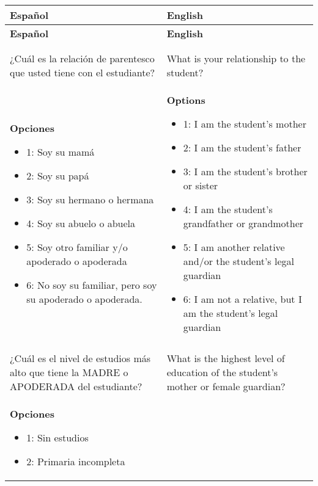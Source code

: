 \documentclass[11pt]{article}
\begin{document}
\newpage
\begin{longtable}{@{}LL@{}}
\toprule
\textbf{Español} & \textbf{English} \\ 
\midrule
\endfirsthead
\toprule
\textbf{Español} & \textbf{English} \\ 
\midrule
\endhead
\bottomrule \\ 
\endfoot
\bottomrule
{} \\ 
¿Cuál es la relación de parentesco que usted tiene con el estudiante? & What is your relationship to the student? \\
\textbf{Opciones}\par\begin{itemize}[leftmargin=*]\item 1: Soy su mamá
\item 2: Soy su papá
\item 3: Soy su hermano o hermana
\item 4: Soy su abuelo o abuela
\item 5: Soy otro familiar y/o apoderado o apoderada
\item 6:  No soy su familiar, pero soy su apoderado o apoderada.\end{itemize} & \textbf{Options}\par\begin{itemize}[leftmargin=*]\item 1: I am the student's mother
\item 2: I am the student's father
\item 3: I am the student's brother or sister
\item 4: I am the student's grandfather or grandmother
\item 5: I am another relative and/or the student's legal guardian
\item 6: I am not a relative, but I am the student's legal guardian\end{itemize} \\
\addlinespace[4pt]
 \\ 
¿Cuál es el nivel de estudios más alto que tiene la MADRE o APODERADA del estudiante? & What is the highest level of education of the student's mother or female guardian? \\
\textbf{Opciones}\par\begin{itemize}[leftmargin=*]\item 1: Sin estudios
\item 2: Primaria incompleta

\end{itemize}
\end{longtable}
\end{document}
